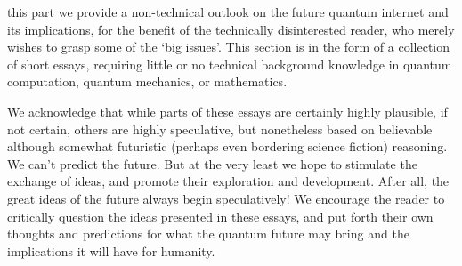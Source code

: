%
%

\newline

\newline

 this part we provide a non-technical outlook on the future quantum internet and its implications, for the benefit of the technically disinterested reader, who merely wishes to grasp some of the `big issues'. This section is in the form of a collection of short essays, requiring little or no technical background knowledge in quantum computation, quantum mechanics, or mathematics. 

We acknowledge that while parts of these essays are certainly highly plausible, if not certain, others are highly speculative, but nonetheless based on believable although somewhat futuristic (perhaps even bordering science fiction) reasoning. We can't predict the future. But at the very least we hope to stimulate the exchange of ideas, and promote their exploration and development. After all, the great ideas of the future always begin speculatively! We encourage the reader to critically question the ideas presented in these essays, and put forth their own thoughts and predictions for what the quantum future may bring and the implications it will have for humanity.

%
%




%
%




%
%




%
%




